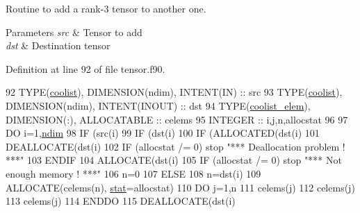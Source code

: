 Routine to add a rank-\/3 tensor to another one. 


\begin{DoxyParams}{Parameters}
{\em src} & Tensor to add \\
\hline
{\em dst} & Destination tensor \\
\hline
\end{DoxyParams}


Definition at line 92 of file tensor.\+f90.


\begin{DoxyCode}
92     \textcolor{keywordtype}{TYPE}(\hyperlink{structtensor_1_1coolist}{coolist}), \textcolor{keywordtype}{DIMENSION(ndim)}, \textcolor{keywordtype}{INTENT(IN)} :: src
93     \textcolor{keywordtype}{TYPE}(\hyperlink{structtensor_1_1coolist}{coolist}), \textcolor{keywordtype}{DIMENSION(ndim)}, \textcolor{keywordtype}{INTENT(INOUT)} :: dst
94     \textcolor{keywordtype}{TYPE}(\hyperlink{structtensor_1_1coolist__elem}{coolist\_elem}), \textcolor{keywordtype}{DIMENSION(:)}, \textcolor{keywordtype}{ALLOCATABLE} :: celems
95     \textcolor{keywordtype}{INTEGER} :: i,j,n,allocstat
96 
97     \textcolor{keywordflow}{DO} i=1,\hyperlink{namespaceparams_a2323fe1773f086e20c14f266351c482b}{ndim}
98        \textcolor{keywordflow}{IF} (src(i)%
99           \textcolor{keywordflow}{IF} (dst(i)%
100              \textcolor{keywordflow}{IF} (\textcolor{keyword}{ALLOCATED}(dst(i)%
101                 \textcolor{keyword}{DEALLOCATE}(dst(i)%
102                 \textcolor{keywordflow}{IF} (allocstat /= 0) stop \textcolor{stringliteral}{"*** Deallocation problem ! ***"}
103 \textcolor{keywordflow}{             ENDIF}
104              \textcolor{keyword}{ALLOCATE}(dst(i)%
105              \textcolor{keywordflow}{IF} (allocstat /= 0) stop \textcolor{stringliteral}{"*** Not enough memory ! ***"}
106              n=0
107           \textcolor{keywordflow}{ELSE}
108              n=dst(i)%
109              \textcolor{keyword}{ALLOCATE}(celems(n), \hyperlink{namespacestat}{stat}=allocstat)
110              \textcolor{keywordflow}{DO} j=1,n
111                 celems(j)%
112                 celems(j)%
113                 celems(j)%
114 \textcolor{keywordflow}{             ENDDO}
115              \textcolor{keyword}{DEALLOCATE}(dst(i)%

\end{DoxyCode}
